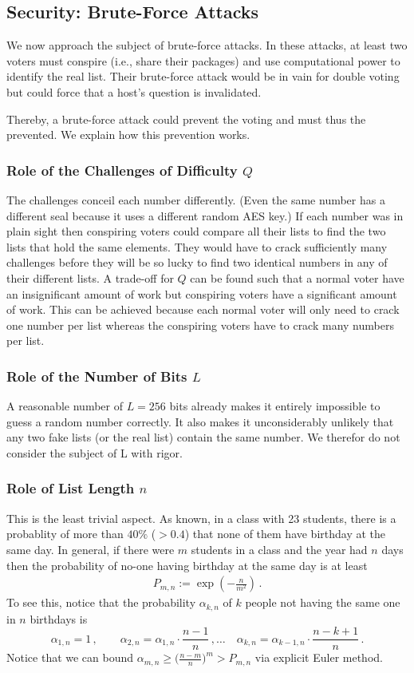 \documentclass{article}
\theoremstyle{definition}
\begin{document}
	\subsection{Security: Brute-Force Attacks}
	We now approach the subject of brute-force attacks. In these attacks, at least two voters must conspire (i.e., share their packages) and use computational power to identify the real list. Their brute-force attack would be in vain for double voting but could force that a host's question is invalidated.
	
	Thereby, a brute-force attack could prevent the voting and must thus the prevented. We explain how this prevention works.
	
	\subsubsection{Role of the Challenges of Difficulty $Q$}
	The challenges conceil each number differently. (Even the same number has a different seal because it uses a different random AES key.) If each number was in plain sight then conspiring voters could compare all their lists to find the two lists that hold the same elements. They would have to crack sufficiently many challenges before they will be so lucky to find two identical numbers in any of their different lists. A trade-off for $Q$ can be found such that a normal voter have an insignificant amount of work but conspiring voters have a significant amount of work. This can be achieved because each normal voter will only need to crack one number per list whereas the conspiring voters have to crack many numbers per list.
	
	\subsubsection{Role of the Number of Bits $L$}
	A reasonable number of $L=256$ bits already makes it entirely impossible to guess a random number correctly. It also makes it unconsiderably unlikely that any two fake lists (or the real list) contain the same number. We therefor do not consider the subject of L with rigor.
	
	\subsubsection{Role of List Length $n$}
	This is the least trivial aspect. As known, in a class with 23 students, there is a probablity of more than $40\%$ ($>0.4$) that none of them have birthday at the same day. In general, if there were $m$ students in a class and the year had $n$ days then the probability of no-one having birthday at the same day is at least
	\begin{align*}
		P_{m,n} := \exp\left(-\frac{n}{m^2}\right)\,.
	\end{align*}
	To see this, notice that the probability $\alpha_{k,n}$ of $k$ people not having the same one in $n$ birthdays is
	$$ \alpha_{1,n}=1\,,\qquad \alpha_{2,n}=\alpha_{1,n} \cdot \frac{n-1}{n}\,,\dots\quad \alpha_{k,n} =\alpha_{k-1,n} \cdot \frac{n-k+1}{n}\,. $$
	Notice that we can bound $\alpha_{m,n} \geq \big(\frac{n-m}{n}\big)^m > P_{m,n}$ via explicit Euler method.
	
\end{document}
